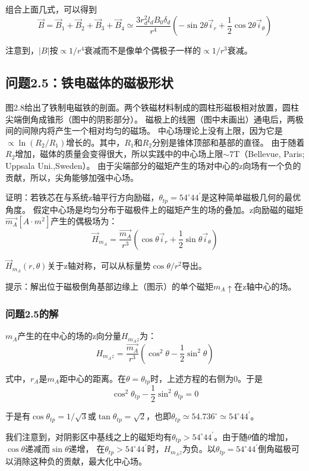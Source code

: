 组合上面几式，可以得到
$$ \vec{B}=\vec{B}_1+\vec{B}_2+\vec{B}_3+\vec{B}_4\simeq \frac{3r_d^2 l_d B_0 \delta_d}{r^4}(-\sin 2\theta \vec{i}_r+\frac{1}{2}\cos 2\theta \vec{i}_\theta)$$

注意到，$|B|$按$\propto 1/r^4$衰减而不是像单个偶极子一样的$\propto 1/r^3$衰减。


\subsection{问题2.5：铁电磁体的磁极形状}
图2.8给出了铁制电磁铁的剖面。两个铁磁材料制成的圆柱形磁极相对放置，圆柱尖端倒角成锥形（图中的阴影部分）。
磁极上的线圈（图中未画出）通电后，两极间的间隙内将产生一个相对均匀的磁场。
中心场理论上没有上限，因为它是$\propto \ln(R_2/R_1)$增长的。其中，$R_1$和$R_2$分别是锥体顶部和基部的直径。
由于随着$R_2$增加，磁体的质量会变得很大，所以实践中的中心场上限$\sim 7$T（Bellevue, Paris; Uppsala Uni.,Sweden）。
由于尖端部分的磁矩产生的场对中心的z向场有一个负的贡献，所以，尖角能够加强中心场。

证明：若铁芯在与系统z轴平行方向励磁，$\theta_{tp}=54^\circ 44^\prime$是这种简单磁极几何的最优角度。
假定中心场是均匀分布于磁极件上的磁矩产生的场的叠加。z向励磁的磁矩$\vec{m_A}[A\cdot m^2]$产生的偶极场为：
$$\vec{H}_{m_A}=\frac{\vec{m_A}}{r^3}(\cos\theta \vec{i}_r+\frac{1}{2}\sin\theta\vec{i}_\theta)$$

$\vec{H}_{m_A}(r,\theta)$关于z轴对称，可以从标量势$\cos\theta/r^2$导出。

提示：解出位于磁极倒角基部边缘上（图示）的单个磁矩$m_A \uparrow$在z轴中心的场。

\subsubsection*{问题2.5的解}

$m_A$产生的在中心的场的z向分量$H_{m_A z}$为：
$$H_{m_A z}=\frac{\vec{m_A}}{r^3}(\cos^2\theta-\frac{1}{2}\sin^2\theta)$$

式中，$r_A$是$m_A$距中心的距离。在$\theta=\theta_{tp}$时，上述方程的右侧为0。于是
$$\cos^2\theta_{tp}-\frac{1}{2}\sin^2\theta_{tp}=0$$

于是有$\cos\theta_{tp}=1/\sqrt{3}$或$\tan\theta_{tp}=\sqrt{2}$，也即$\theta_{tp}\simeq 54.736^\circ\simeq54^\circ 44^\prime$。

我们注意到，对阴影区中基线之上的磁矩均有$\theta_{tp}>54^\circ 44^\prime$。由于随$\theta$值的增加，$\cos\theta$递减而$\sin\theta$递增，
在$\theta_{tp}>54^\circ 44^\prime$时，$H_{m_A z}$为负。以$\theta_{tp}=54^\circ 44^\prime$倒角磁极可以消除这种负的贡献，最大化中心场。

